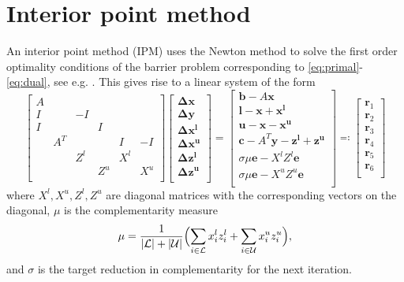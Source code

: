 \documentclass[a4paper]{article}
\newcommand{\bvec}{\mathbf b}
\newcommand{\cvec}{\mathbf c}
\newcommand{\evec}{\mathbf e}
\newcommand{\lvec}{\mathbf l}
\newcommand{\rvec}{\mathbf r}
\newcommand{\uvec}{\mathbf u}
\newcommand{\xvec}{\mathbf x}
\newcommand{\xl}{\mathbf {x^l}}
\newcommand{\xu}{\mathbf {x^u}}
\newcommand{\yvec}{\mathbf y}
\newcommand{\zl}{\mathbf {z^l}}
\newcommand{\zu}{\mathbf {z^u}}
\newcommand{\0}{\mathbf 0}
\newcommand{\dx}{\boldsymbol{\Delta x}}
\newcommand{\dxl}{\boldsymbol{\Delta x^l}}
\newcommand{\dxu}{\boldsymbol{\Delta x^u}}
\newcommand{\dy}{\boldsymbol{\Delta y}}
\newcommand{\dzl}{\boldsymbol{\Delta z^l}}
\newcommand{\dzu}{\boldsymbol{\Delta z^u}}
\begin{document}
\section{Interior point method}
\label{sec:ipm}

An interior point method (IPM) uses the Newton method to solve the first order optimality conditions of the barrier problem corresponding to \eqref{eq:primal}-\eqref{eq:dual}, see e.g. \cite{Wri:book}. This gives rise to a linear system of the form
\begin{equation}
\label{eq:big_system}
\begin{bmatrix}
A &     &     &     &     &     \\
I &     & -I  &     &     &     \\
I &     &     & I   &     &     \\
  & A^T &     &     & I   & -I  \\
  &     & Z^l &     & X^l &     \\
  &     &     & Z^u &     & X^u \\
\end{bmatrix}
\begin{bmatrix}
\dx \\ \dy \\ \dxl \\ \dxu \\ \dzl \\ \dzu \\
\end{bmatrix}
=
\begin{bmatrix}
\bvec-A\xvec           \\
\lvec-\xvec+\xl        \\
\uvec-\xvec-\xu        \\
\cvec-A^T\yvec-\zl+\zu \\
\sigma\mu\evec-X^lZ^l\evec   \\
\sigma\mu\evec-X^uZ^u\evec   \\
\end{bmatrix}
\eqqcolon
\begin{bmatrix}
\rvec_1 \\ \rvec_2 \\ \rvec_3 \\
\rvec_4 \\ \rvec_5 \\ \rvec_6 \\
\end{bmatrix}
\end{equation}
where $X^l,X^u,Z^l,Z^u$ are diagonal matrices with the corresponding vectors on the diagonal, $\mu$ is the complementarity measure
\[\mu = \frac{1}{|\mathcal L| + |\mathcal U|}\Bigl(\sum_{i\in\mathcal L}x^l_iz^l_i + \sum_{i\in\mathcal U}x^u_iz^u_i\Bigr),
\]
and $\sigma$ is the target reduction in complementarity for the next iteration.
\end{document}
